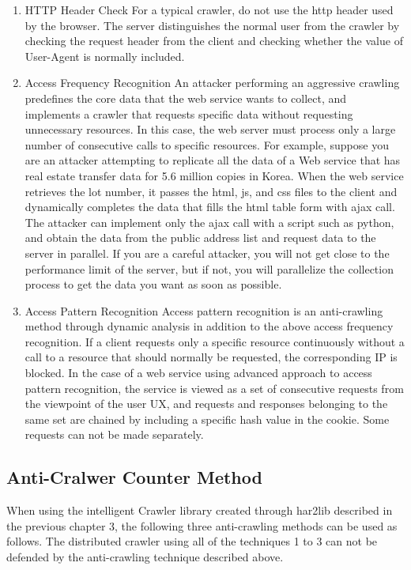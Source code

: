 \begin{enumerate}
\item HTTP Header Check
\newline For a typical crawler, do not use the http header used by the browser. The server distinguishes the normal user from the crawler by checking the request header from the client and checking whether the value of User-Agent is normally included.
\newline
\item Access Frequency Recognition
\newline 
An attacker performing an aggressive crawling predefines the core data that the web service wants to collect, and implements a crawler that requests specific data without requesting unnecessary resources. In this case, the web server must process only a large number of consecutive calls to specific resources. For example, suppose you are an attacker attempting to replicate all the data of a Web service that has real estate transfer data for 5.6 million copies in Korea. When the web service retrieves the lot number, it passes the html, js, and css files to the client and dynamically completes the data that fills the html table form with ajax call. The attacker can implement only the ajax call with a script such as python, and obtain the data from the public address list and request data to the server in parallel. If you are a careful attacker, you will not get close to the performance limit of the server, but if not, you will parallelize the collection process to get the data you want as soon as possible.
\newline
\item Access Pattern Recognition
\newline
Access pattern recognition is an anti-crawling method through dynamic analysis in addition to the above access frequency recognition. If a client requests only a specific resource continuously without a call to a resource that should normally be requested, the corresponding IP is blocked. In the case of a web service using advanced approach to access pattern recognition, the service is viewed as a set of consecutive requests from the viewpoint of the user UX, and requests and responses belonging to the same set are chained by including a specific hash value in the cookie. Some requests can not be made separately.
\end{enumerate}


\subsection{Anti-Cralwer Counter Method}
When using the intelligent Crawler library created through har2lib described in the previous chapter 3, the following three anti-crawling methods can be used as follows. The distributed crawler using all of the techniques 1 to 3 can not be defended by the anti-crawling technique described above.



